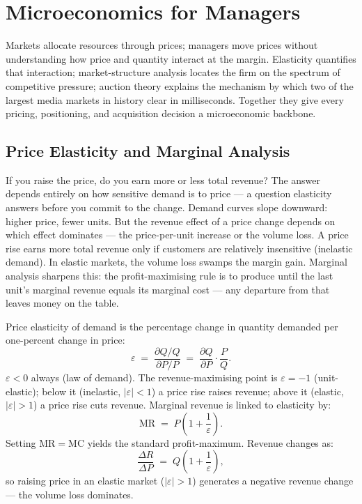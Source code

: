 \chapter{Microeconomics for Managers}\label{ch:microeconomics}


Markets allocate resources through prices; managers move prices without understanding how price
and quantity interact at the margin. Elasticity quantifies that interaction; market-structure
analysis locates the firm on the spectrum of competitive pressure; auction theory explains the
mechanism by which two of the largest media markets in history clear in milliseconds. Together
they give every pricing, positioning, and acquisition decision a microeconomic backbone.

\section{Price Elasticity and Marginal Analysis}\label{sec:elasticity}

If you raise the price, do you earn more or less total revenue? The answer depends entirely on
how sensitive demand is to price --- a question elasticity answers before you commit to the change.
Demand curves slope downward: higher price, fewer units. But the revenue effect of a price change
depends on which effect dominates --- the price-per-unit increase or the volume loss. A price rise
earns more total revenue only if customers are relatively insensitive (inelastic demand). In
elastic markets, the volume loss swamps the margin gain. Marginal analysis sharpens this: the
profit-maximising rule is to produce until the last unit's marginal revenue equals its marginal
cost --- any departure from that leaves money on the table.

Price elasticity of demand is the percentage change in quantity demanded per one-percent change in price:
\begin{equation}\label{eq:elasticity}
  \varepsilon \;=\; \frac{\partial Q/Q}{\partial P/P}
              \;=\; \frac{\partial Q}{\partial P}\cdot\frac{P}{Q}.
\end{equation}
\(\varepsilon<0\) always (law of demand). The revenue-maximising point is \(\varepsilon=-1\)
(unit-elastic); below it (inelastic, \(|\varepsilon|<1\)) a price rise raises revenue; above it
(elastic, \(|\varepsilon|>1\)) a price rise cuts revenue. Marginal revenue is linked to elasticity by:
\[
  \mathrm{MR} \;=\; P\!\left(1+\frac{1}{\varepsilon}\right).
\]
Setting \(\mathrm{MR}=\mathrm{MC}\) yields the standard profit-maximum. Revenue changes as:
\[
  \frac{\Delta R}{\Delta P} \;=\; Q\!\left(1 + \frac{1}{\varepsilon}\right),
\]
so raising price in an elastic market (\(|\varepsilon|>1\)) generates a negative revenue change ---
the volume loss dominates.


